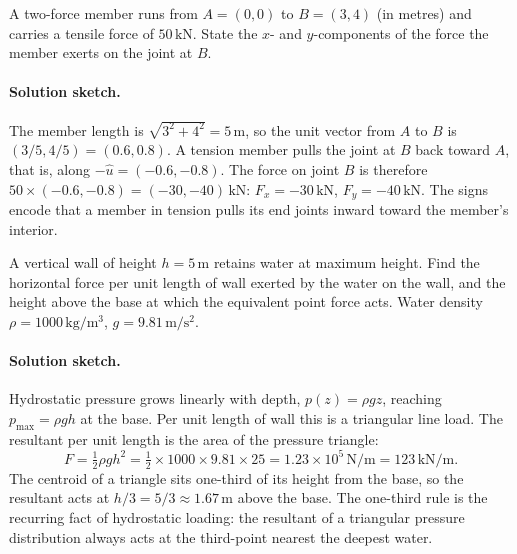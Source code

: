 \begin{exercise}
A two-force member runs from $A = (0, 0)$ to $B = (3, 4)$ (in
metres) and carries a tensile force of $50\,\text{kN}$. State the
$x$- and $y$-components of the force the member exerts on the joint
at $B$.

\paragraph{Solution sketch.} The member length is
$\sqrt{3^2 + 4^2} = 5\,\si{\meter}$, so the unit vector from $A$ to
$B$ is $(3/5, 4/5) = (0.6, 0.8)$. A tension member pulls the joint at
$B$ back toward $A$, that is, along $-\hat{u} = (-0.6, -0.8)$. The force
on joint $B$ is therefore $50 \times (-0.6, -0.8) = (-30, -40)\,\text{kN}$:
$F_x = -30\,\text{kN}$, $F_y = -40\,\text{kN}$. The signs encode that a
member in tension pulls its end joints inward toward the member's
interior.
\end{exercise}

\begin{exercise}
A vertical wall of height $h = 5\,\si{\meter}$ retains water at
maximum height. Find the horizontal force per unit length of wall
exerted by the water on the wall, and the height above the base at
which the equivalent point force acts. Water density $\rho =
1000\,\si{\kilogram\per\meter\cubed}$, $g = 9.81\,\si{\meter\per\second
\squared}$.

\paragraph{Solution sketch.} Hydrostatic pressure grows linearly with
depth, $p(z) = \rho g z$, reaching $p_{\max} = \rho g h$ at the base.
Per unit length of wall this is a triangular line load. The resultant
per unit length is the area of the pressure triangle:
\[
F = \tfrac12 \rho g h^2 = \tfrac12 \times 1000 \times 9.81 \times 25
= 1.23 \times 10^{5}\,\text{N/m} = 123\,\text{kN/m}.
\]
The centroid of a triangle sits one-third of its height from the base,
so the resultant acts at $h/3 = 5/3 \approx 1.67\,\si{\meter}$ above the
base. The one-third rule is the recurring fact of hydrostatic loading:
the resultant of a triangular pressure distribution always acts at the
third-point nearest the deepest water.
\end{exercise}

